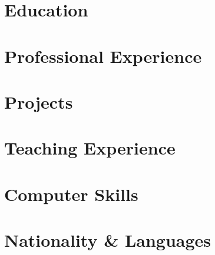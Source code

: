 \documentclass{resume}
\begin{document}
    

\section{Education}
    
    

\section{Professional Experience}
    

\section{Projects}
    
    

\section{Teaching Experience}
    
    

\section{Computer Skills}
    
    
    
    
\section{Nationality \& Languages}
	
\end{document}
